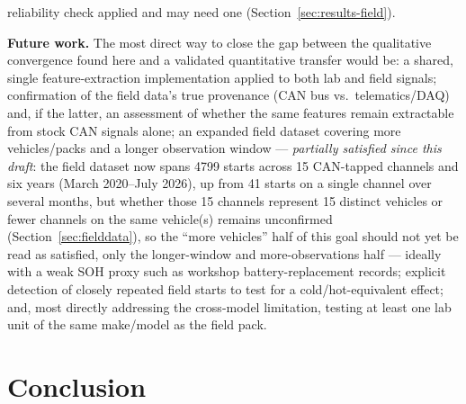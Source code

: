 \documentclass[conference]{IEEEtran}
\begin{document}
reliability check applied and may need one (Section~\ref{sec:results-field}).

\textbf{Future work.} The most direct way to close the gap between the qualitative convergence found here and a validated quantitative transfer would be: a shared, single feature-extraction implementation applied to both lab and field signals; confirmation of the field data's true provenance (CAN bus vs.\ telematics/DAQ) and, if the latter, an assessment of whether the same features remain extractable from stock CAN signals alone; an expanded field dataset covering more vehicles/packs and a longer observation window --- \emph{partially satisfied since this draft}: the field dataset now spans 4799 starts across 15 CAN-tapped channels and six years (March 2020--July 2026), up from 41 starts on a single channel over several months, but whether those 15 channels represent 15 distinct vehicles or fewer channels on the same vehicle(s) remains unconfirmed (Section~\ref{sec:fielddata}), so the ``more vehicles'' half of this goal should not yet be read as satisfied, only the longer-window and more-observations half --- ideally with a weak SOH proxy such as workshop battery-replacement records; explicit detection of closely repeated field starts to test for a cold/hot-equivalent effect; and, most directly addressing the cross-model limitation, testing at least one lab unit of the same make/model as the field pack.

\section{Conclusion}
\label{sec:conclusion}
\end{document}
